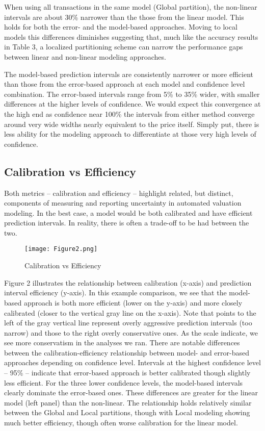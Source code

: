 \documentclass[colTwo]{anon}
\theoremstyle{definition}
\begin{document}
When using all transactions in the same model (Global partition), the non-linear intervals are about 30\% narrower than the those from the linear model.  This holds for both the error- and the model-based approaches. Moving to local models this differences diminishes suggesting that, much like the accuracy results in Table 3, a localized partitioning scheme can narrow the performance gaps between linear and non-linear modeling approaches. 

The model-based prediction intervals are consistently narrower or more efficient than those from the error-based approach at each model and confidence level combination. The error-based intervals range from 5\% to 35\% wider, with smaller differences at the higher levels of confidence.  We would expect this convergence at the high end as confidence near 100\% the intervals from either method converge around very wide widths nearly equivalent to the price itself.  Simply put, there is less ability for the modeling approach to differentiate at those very high levels of confidence.  

\subsection{Calibration vs Efficiency}

Both metrics -- calibration and efficiency -- highlight related, but distinct, components of measuring and reporting uncertainty in  automated valuation modeling.  In the best case, a model would be both calibrated and have efficient prediction intervals. In reality, there is often a trade-off to be had between the two.  

\begin{figure*}[h!]
\centering
\texttt{[image: Figure2.png]}
\caption{Calibration vs Efficiency}
\label{fig:calibsens}
\end{figure*}

Figure 2 illustrates the relationship between calibration (x-axis) and prediction interval efficiency (y-axis). In this example comparison, we see that the model-based approach is both more efficient (lower on the y-axis) and more closely calibrated (closer to the vertical gray line on the x-axis). Note that points to the left of the gray vertical line represent overly aggressive prediction intervals (too narrow) and those to the right overly conservative ones.  As the scale indicate, we see more conservatism in the analyses we ran.     
There are notable differences between the calibration-efficiency relationship between model- and error-based approaches depending on confidence level.  Intervals at the highest confidence level -- 95\% -- indicate that error-based approach is better calibrated though slightly less efficient. For the three lower confidence levels, the model-based intervals clearly dominate the error-based ones. These differences are greater for the linear model (left panel) than the non-linear.  The relationship holds relatively similar between the Global and Local partitions, though with Local modeling showing much better efficiency, though often worse calibration for the linear model.    
\end{document}
